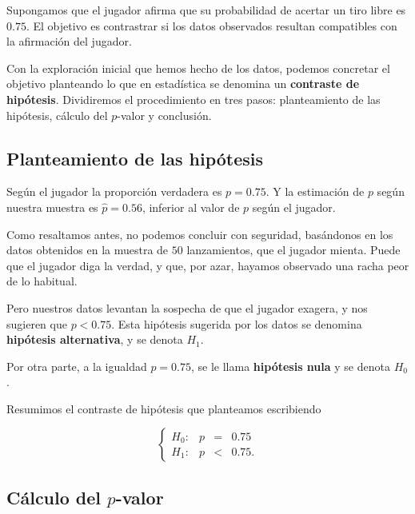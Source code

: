 \documentclass[
  notoc,
  nobib,
  degree=inf]{mnye}
\begin{document}
\begin{ebox}{}
Supongamos que el jugador afirma que su probabilidad de acertar un tiro libre es \(0.75\). El objetivo es contrastrar si los datos observados resultan compatibles con la afirmación del jugador.

\end{ebox}

Con la exploración inicial que hemos hecho de los datos, podemos concretar el objetivo planteando lo que en estadística se denomina un \textbf{contraste de hipótesis}. Dividiremos el procedimiento en tres pasos: planteamiento de las hipótesis, cálculo del \(p\)-valor y conclusión.

\hypertarget{planteamiento-de-las-hipuxf3tesis}{%
\subsection{Planteamiento de las hipótesis}\label{planteamiento-de-las-hipuxf3tesis}}

Según el jugador la proporción verdadera es \(p=0.75\). Y la estimación de \(p\) según nuestra muestra es \(\widehat{p}=0.56\), inferior al valor de \(p\) según el jugador.

Como resaltamos antes, no podemos concluir con seguridad, basándonos en los datos obtenidos en la muestra de \(50\) lanzamientos, que el jugador mienta. Puede que el jugador diga la verdad, y que, por azar, hayamos observado una racha peor de lo habitual.

Pero nuestros datos levantan la sospecha de que el jugador exagera, y nos sugieren que \(p<0.75\). Esta hipótesis sugerida por los datos se denomina \textbf{hipótesis alternativa}, y se denota \(H_1\).

Por otra parte, a la igualdad \(p=0.75\), se le llama \textbf{hipótesis nula} y se denota \(H_0\).

Resumimos el contraste de hipótesis que planteamos escribiendo

\[
  \left\{
  \begin{array}{lrcl}
    H_0:&p&=&0.75\\
    H_1:&p&<&0.75.
  \end{array}
  \right.
\]

\hypertarget{cuxe1lculo-del-p-valor}{%
\subsection{\texorpdfstring{Cálculo del \(p\)-valor}{Cálculo del p-valor}}\label{cuxe1lculo-del-p-valor}}
\end{document}
